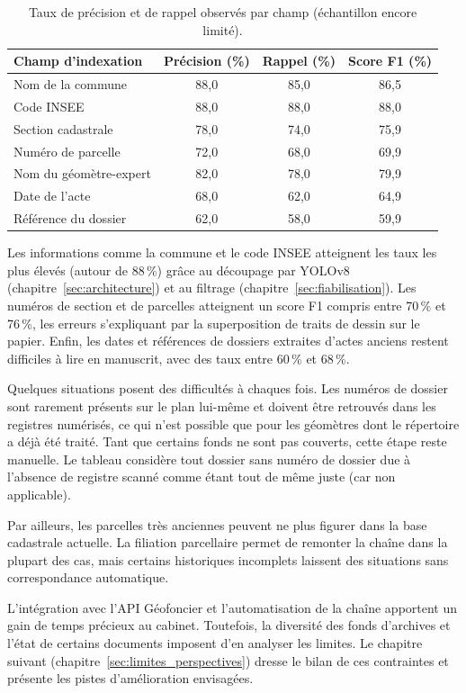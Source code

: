 \begin{table}[H]
  \centering
  \caption{Taux de précision et de rappel observés par champ (échantillon encore limité).}
  \label{tab:precision_par_champ}
  \small
  \begin{tabular}{p{4.5cm} c c c}
    \toprule
    \textbf{Champ d'indexation} & \textbf{Précision (\%)} & \textbf{Rappel (\%)} & \textbf{Score F1 (\%)} \\
    \midrule
    Nom de la commune & 88,0 & 85,0 & 86,5 \\
    Code INSEE & 88,0 & 88,0 & 88,0 \\
    Section cadastrale & 78,0 & 74,0 & 75,9 \\
    Numéro de parcelle & 72,0 & 68,0 & 69,9 \\
    Nom du géomètre-expert & 82,0 & 78,0 & 79,9 \\
    Date de l'acte & 68,0 & 62,0 & 64,9 \\
    Référence du dossier & 62,0 & 58,0 & 59,9 \\
    \bottomrule
  \end{tabular}
\end{table}

Les informations comme la commune et le code INSEE atteignent les taux les plus élevés (autour de 88\,\%) grâce au découpage par YOLOv8 (chapitre~\ref{sec:architecture}) et au filtrage (chapitre~\ref{sec:fiabilisation}). Les numéros de section et de parcelles atteignent un score F1 compris entre 70\,\% et 76\,\%, les erreurs s'expliquant par la superposition de traits de dessin sur le papier. Enfin, les dates et références de dossiers extraites d'actes anciens restent difficiles à lire en manuscrit, avec des taux entre 60\,\% et 68\,\%.

Quelques situations posent des difficultés à chaques fois. Les numéros de dossier sont rarement présents sur le plan lui-même et doivent être retrouvés dans les registres numérisés, ce qui n'est possible que pour les géomètres dont le répertoire a déjà été traité. Tant que certains fonds ne sont pas couverts, cette étape reste manuelle. Le tableau considère tout dossier sans numéro de dossier due à l'absence de registre scanné comme étant tout de même juste (car non applicable).

Par ailleurs, les parcelles très anciennes peuvent ne plus figurer dans la base cadastrale actuelle. La filiation parcellaire permet de remonter la chaîne dans la plupart des cas, mais certains historiques incomplets laissent des situations sans correspondance automatique.

L'intégration avec l'API Géofoncier et l'automatisation de la chaîne apportent un gain de temps précieux au cabinet. Toutefois, la diversité des fonds d'archives et l'état de certains documents imposent d'en analyser les limites. Le chapitre suivant (chapitre~\ref{sec:limites_perspectives}) dresse le bilan de ces contraintes et présente les pistes d'amélioration envisagées.



